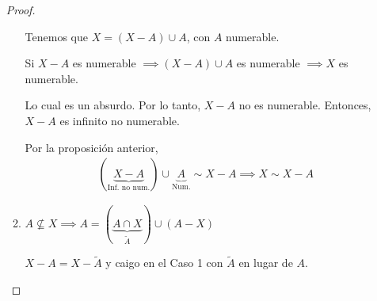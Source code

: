 \begin{enumerate}
\begin{proof}
\begin{enumerate}
                Tenemos que $X = (X-A) \cup A$, con $A$ numerable.

                Si $X-A$ es numerable $\implies (X-A)\cup A$ es numerable
                $\implies X$ es numerable.

                Lo cual es un absurdo. Por lo tanto, $X-A$ no es numerable.
                Entonces, $X-A$ es infinito no numerable.

                \medskip

                Por la proposición anterior, 
                \begin{gather*}
                    (\underbrace{X-A}_{\text{Inf. no num.}}) \cup
                    \underbrace{A}_{\text{Num.}} \sim X-A
                    \implies X \sim X - A
                \end{gather*}


            \item $A \not\subseteq X \implies A = 
                (\underbrace{A \cap X}_{\widetilde{A}}) \cup (A-X)$

                $X-A=X-\widetilde{A}$ y caigo en el Caso 1 con $\widetilde{A}$ en 
                lugar de $A$. %

        \end{enumerate}
    \end{proof}
\end{enumerate}

